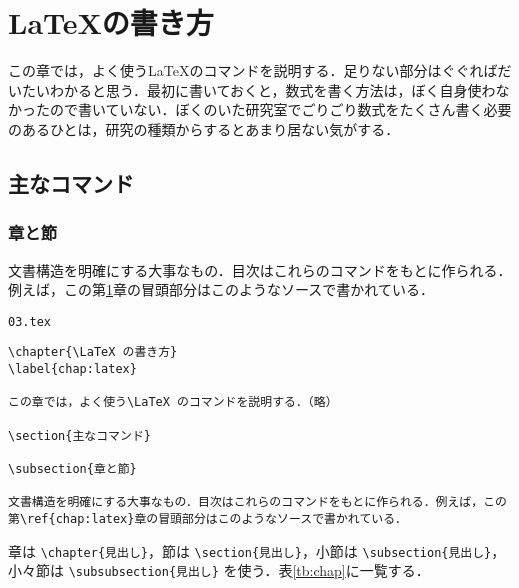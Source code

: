 \chapter{\LaTeX の書き方}
\label{chap:latex}

この章では，よく使う\LaTeX のコマンドを説明する．足りない部分はぐぐればだいたいわかると思う．最初に書いておくと，数式を書く方法は，ぼく自身使わなかったので書いていない．ぼくのいた研究室でごりごり数式をたくさん書く必要のあるひとは，研究の種類からするとあまり居ない気がする．

\section{主なコマンド}

\subsection{章と節}

文書構造を明確にする大事なもの．目次はこれらのコマンドをもとに作られる．例えば，この第\ref{chap:latex}章の冒頭部分はこのようなソースで書かれている．

\begin{itembox}[l]{\texttt{03.tex}}
\begin{verbatim}
\chapter{\LaTeX の書き方}
\label{chap:latex}

この章では，よく使う\LaTeX のコマンドを説明する．（略）

\section{主なコマンド}

\subsection{章と節}

文書構造を明確にする大事なもの．目次はこれらのコマンドをもとに作られる．例えば，この第\ref{chap:latex}章の冒頭部分はこのようなソースで書かれている．
\end{verbatim}
\end{itembox}

章は \verb|\chapter{見出し}|，節は \verb|\section{見出し}|，小節は \verb|\subsection{見出し}|，小々節は \verb|\subsubsection{見出し}| を使う．表\ref{tb:chap}に一覧する．

